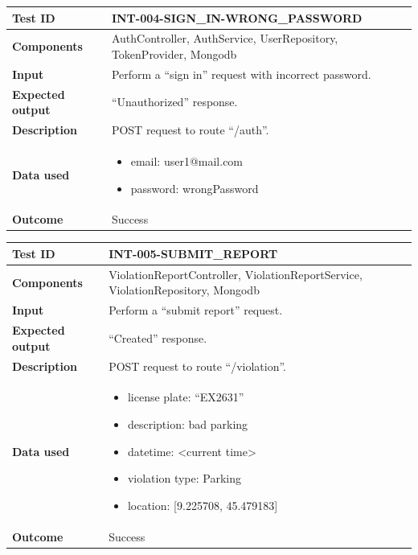 \begin{table}[H]
    \centering
    \begin{tabular}{p{3cm}p{10cm}}
    \textbf{Test ID} & INT-004-SIGN\_IN-WRONG\_PASSWORD \\ \hline
    \textbf{Components} & AuthController, AuthService, UserRepository, TokenProvider, Mongodb \\ \hline
    \textbf{Input} & Perform a “sign in” request with incorrect password. \\ \hline
    \textbf{Expected output} & “Unauthorized” response. \\ \hline
    \textbf{Description} & POST request to route “/auth”. \\ \hline
    \textbf{Data used} & 
        \begin{itemize}[label={}] \itemsep0em
            \item email: user1@mail.com
            \item password: wrongPassword
        \end{itemize} \\ \hline
    \textbf{Outcome} & Success \\ \hline
    \end{tabular}
\end{table}

\begin{table}[H]
    \centering
    \begin{tabular}{p{3cm}p{10cm}}
    \textbf{Test ID} & INT-005-SUBMIT\_REPORT \\ \hline
    \textbf{Components} & ViolationReportController, ViolationReportService, ViolationRepository, Mongodb \\ \hline
    \textbf{Input} & Perform a “submit report” request. \\ \hline
    \textbf{Expected output} & “Created” response. \\ \hline
    \textbf{Description} & POST request to route “/violation”. \\ \hline
    \textbf{Data used} & 
        \begin{itemize}[label={}] \itemsep0em
            \item license plate: “EX2631”
            \item description: bad parking
            \item datetime: <current time>
            \item violation type: Parking
            \item location: [9.225708, 45.479183]
        \end{itemize} \\ \hline
    \textbf{Outcome} & Success \\ \hline
    \end{tabular}
\end{table}

